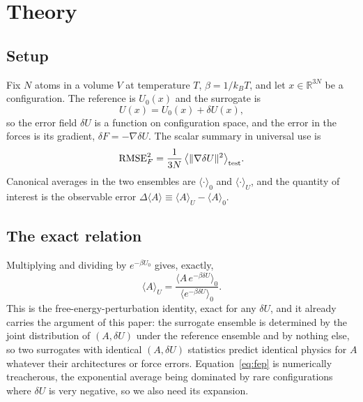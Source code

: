 \documentclass[aip,jcp,reprint,amsmath,amssymb,floatfix]{revtex4-2}
\newcommand{\dU}{\ensuremath{\delta U}}
\newcommand{\avg}[1]{\ensuremath{\langle #1 \rangle}}
\newcommand{\avgz}[1]{\ensuremath{\langle #1 \rangle_{0}}}
\begin{document}
\section{Theory}
\label{sec:theory}

\subsection{Setup}

Fix $N$ atoms in a volume $V$ at temperature $T$, $\beta = 1/k_BT$, and let
$x \in \mathbb{R}^{3N}$ be a configuration. The reference is $U_0(x)$
and the surrogate is
\begin{equation}
U(x) = U_0(x) + \dU(x),
\end{equation}
so the error field $\dU$ is a function on configuration space, and the error in
the forces is its gradient, $\delta F = -\nabla \dU$. The scalar summary in
universal use is
\begin{equation}
\mathrm{RMSE}_F^2 = \frac{1}{3N}\,\big\langle \|\nabla \dU\|^2 \big\rangle_{\rm test}.
\label{eq:frmse}
\end{equation}
Canonical averages in the two ensembles are $\avgz{\cdot}$ and $\avg{\cdot}_U$,
and the quantity of interest is the observable error
$\Delta\avg{A} \equiv \avg{A}_U - \avgz{A}$.

\subsection{The exact relation}

Multiplying and dividing by $e^{-\beta U_0}$ gives, exactly,
\begin{equation}
\avg{A}_U = \frac{\avgz{A\,e^{-\beta \dU}}}{\avgz{e^{-\beta \dU}}} .
\label{eq:fep}
\end{equation}
This is the free-energy-perturbation identity\cite{Zwanzig1954}, exact for any
$\dU$, and it already carries the argument of this paper: the surrogate ensemble
is determined by the joint distribution of $(A, \dU)$ under the reference
ensemble and by nothing else, so two surrogates with identical
$(A,\dU)$ statistics predict identical physics for $A$ whatever their
architectures or force errors. Equation~\eqref{eq:fep} is
numerically treacherous, the exponential average being dominated by rare
configurations where $\dU$ is very negative\cite{Bennett1976, ShirtsChodera2008,
FrenkelSmit2002}, so we also need its expansion.
\end{document}
